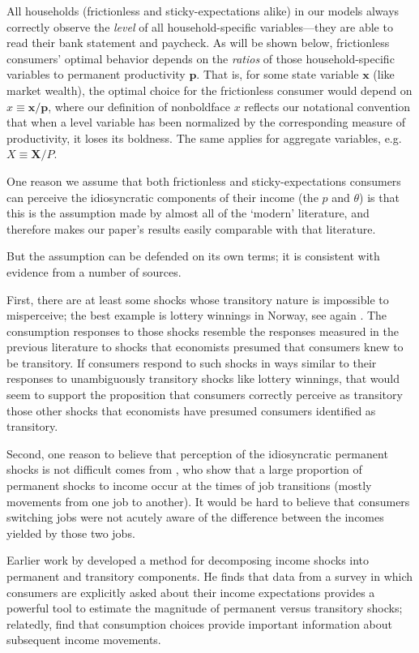 \documentclass[titlepage]{./econtex}
\begin{document}
All households (frictionless and sticky-expectations alike) in our models always correctly observe the \textit{level} of all household-specific variables---they are able to read their bank statement and paycheck. As will be shown below, frictionless consumers' optimal behavior depends on the {\it ratios} of those household-specific variables to permanent productivity $\pmb{p}$.  That is, for some state variable $\textbf{x}$ (like market wealth), the optimal choice for the frictionless consumer would depend on ${x} \equiv \mathbf{x}/{\pmb{p}}$, where our definition of nonboldface ${x}$ reflects our notational convention that when a level variable has been normalized by the corresponding measure of productivity, it loses its boldness.  The same applies for aggregate variables, e.g.\ ${X} \equiv \mathbf{X}/{P}$.


One reason we assume that both frictionless and sticky-expectations consumers can perceive the idiosyncratic components of their income (the $p$ and $\theta$) is that this is the assumption made by almost all of the `modern' literature, and therefore makes our paper's results easily comparable with that literature.

But the assumption can be defended on its own terms; it is consistent with evidence from a number of sources.

First, there are at least some shocks whose transitory nature is impossible to misperceive; the best example is lottery winnings in Norway, see again \cite{fhnMPC}.  The consumption responses to those shocks resemble the responses measured in the previous literature to shocks that economists presumed that consumers knew to be transitory.  If consumers respond to such shocks in ways similar to their responses to unambiguously transitory shocks like lottery winnings, that would seem to support the proposition that consumers correctly perceive as transitory those other shocks that economists have presumed consumers identified as transitory.

Second, one reason to believe that perception of the idiosyncratic permanent shocks is not difficult comes from \cite{lmpPermShocks}, who show that a large proportion of permanent shocks to income occur at the times of job transitions (mostly movements from one job to another).  It would be hard to believe that consumers switching jobs were not acutely aware of the difference between the incomes yielded by those two jobs.

Earlier work by \cite{pistaferriSuperior} developed a method for decomposing income shocks into permanent and transitory components.  He finds that data from a survey in which consumers are explicitly asked about their income expectations provides a powerful tool to estimate the magnitude of permanent versus transitory shocks; relatedly, \cite{gsInferring} find that consumption choices provide important information about subsequent income movements.
\end{document}
